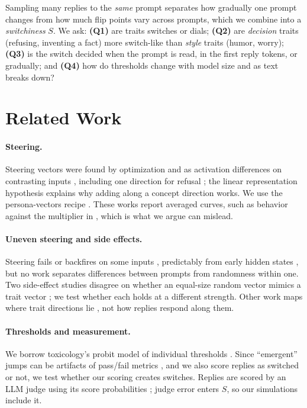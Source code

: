 \documentclass{article}
\begin{document}
Sampling many replies to the \emph{same} prompt separates how gradually one prompt changes from how much flip points vary across prompts, which we combine into a \emph{switchiness} $S$. We ask: \textbf{(Q1)} are traits switches or dials; \textbf{(Q2)} are \emph{decision} traits (refusing, inventing a fact) more switch-like than \emph{style} traits (humor, worry); \textbf{(Q3)} is the switch decided when the prompt is read, in the first reply tokens, or gradually; and \textbf{(Q4)} how do thresholds change with model size and as text breaks down?

\section{Related Work}

\paragraph{Steering.} Steering vectors were found by optimization \cite{subramani2022latent} and as activation differences on contrasting inputs \cite{turner2023actadd,rimsky2024caa,zou2023repe,li2023iti}, including one direction for refusal \cite{arditi2024refusal}; the linear representation hypothesis \cite{park2024linear} explains why adding along a concept direction works. We use the persona-vectors recipe \cite{chen2025persona}. These works report averaged curves, such as behavior against the multiplier in \citet{rimsky2024caa}, which is what we argue can mislead.

\paragraph{Uneven steering and side effects.} Steering fails or backfires on some inputs \cite{tan2024reliability,braun2025unreliability}, predictably from early hidden states \cite{fan2026steerable}, but no work separates differences between prompts from randomness within one. Two side-effect studies disagree on whether an equal-size random vector mimics a trait vector \cite{malla2026interference,ong2026sideeffects}; we test whether each holds at a different strength. Other work maps where trait directions lie \cite{lu2026assistant,xu2026manifold,abootorabi2026geometry}, not how replies respond along them.

\paragraph{Thresholds and measurement.} We borrow toxicology's probit model of individual thresholds \cite{bliss1934probit,finney1971probit}. Since ``emergent'' jumps \cite{wei2022emergent} can be artifacts of pass/fail metrics \cite{schaeffer2023mirage}, and we also score replies as switched or not, we test whether our scoring creates switches. Replies are scored by an LLM judge \cite{zheng2023judge} using its score probabilities \cite{liu2023geval}; judge error enters $S$, so our simulations include it.
\end{document}

